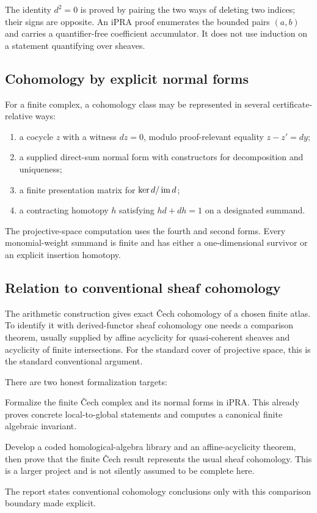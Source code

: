 The identity $d^2=0$ is proved by pairing the two ways of deleting two indices; their signs are
opposite.  An iPRA proof enumerates the bounded pairs $(a,b)$ and carries a quantifier-free
coefficient accumulator.  It does not use induction on a statement quantifying over sheaves.

\subsection{Cohomology by explicit normal forms}

For a finite complex, a cohomology class may be represented in several certificate-relative ways:

\begin{enumerate}[label=\arabic*.]
\item a cocycle $z$ with a witness $dz=0$, modulo proof-relevant equality
      $z-z'=dy$;
\item a supplied direct-sum normal form with constructors for decomposition and uniqueness;
\item a finite presentation matrix for $\ker d/\operatorname{im} d$;
\item a contracting homotopy $h$ satisfying $hd+dh=1$ on a designated summand.
\end{enumerate}

The projective-space computation uses the fourth and second forms.  Every monomial-weight summand is
finite and has either a one-dimensional survivor or an explicit insertion homotopy.

\subsection{Relation to conventional sheaf cohomology}

The arithmetic construction gives exact \v{C}ech cohomology of a chosen finite atlas.  To identify it
with derived-functor sheaf cohomology one needs a comparison theorem, usually supplied by affine
acyclicity for quasi-coherent sheaves and acyclicity of finite intersections.  For the standard cover
of projective space, this is the standard conventional argument.

There are two honest formalization targets:

\begin{description}[style=nextline]
\item[Immediate target.]
Formalize the finite \v{C}ech complex and its normal forms in iPRA.  This already proves concrete
local-to-global statements and computes a canonical finite algebraic invariant.

\item[Extended target.]
Develop a coded homological-algebra library and an affine-acyclicity theorem, then prove that the
finite \v{C}ech result represents the usual sheaf cohomology.  This is a larger project and is not
silently assumed to be complete here.
\end{description}

The report states conventional cohomology conclusions only with this comparison boundary made
explicit.

